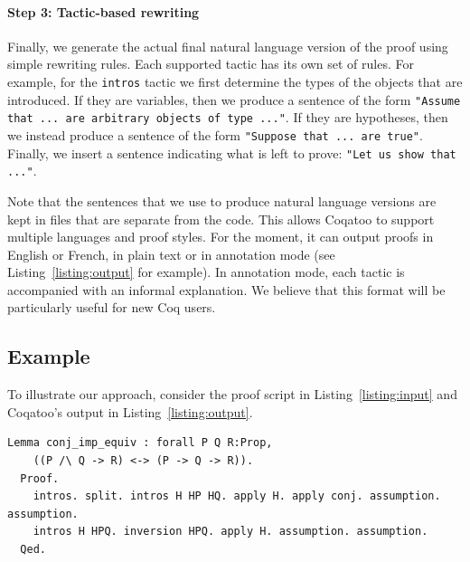\documentclass[sigplan,screen,9pt]{acmart}
\begin{document}
\paragraph{Step 3: Tactic-based rewriting}
Finally, we generate the actual final natural language version of the proof using simple rewriting rules. Each supported tactic has its own set of rules. For example, for the \lstinline{intros} tactic we first determine the types of the objects that are introduced. If they are variables, then we produce a sentence of the form \lstinline{"Assume that ... are arbitrary objects of type ..."}. If they are hypotheses, then we instead produce a sentence of the form \lstinline{"Suppose that ... are true"}. Finally, we insert a sentence indicating what is left to prove: \lstinline{"Let us show that ..."}. 

Note that the sentences that we use to produce natural language versions are kept in files that are separate from the code. This allows Coqatoo to support multiple languages and proof styles. For the moment, it can output proofs in English or French, in plain text or in annotation mode (see Listing~\ref{listing:output} for example). In annotation mode, each tactic is accompanied with an informal explanation. We believe that this format will be particularly useful for new Coq users.

\subsection{Example}
To illustrate our approach, consider the proof script in Listing~\ref{listing:input} and Coqatoo's output in Listing~\ref{listing:output}.
\begin{lstlisting}[label=listing:input,captionpos=b,caption=Proof script given as input]
  Lemma conj_imp_equiv : forall P Q R:Prop, 
    ((P /\ Q -> R) <-> (P -> Q -> R)).
  Proof.
    intros. split. intros H HP HQ. apply H. apply conj. assumption. assumption. 
    intros H HPQ. inversion HPQ. apply H. assumption. assumption.
  Qed.
\end{lstlisting}
\end{document}
